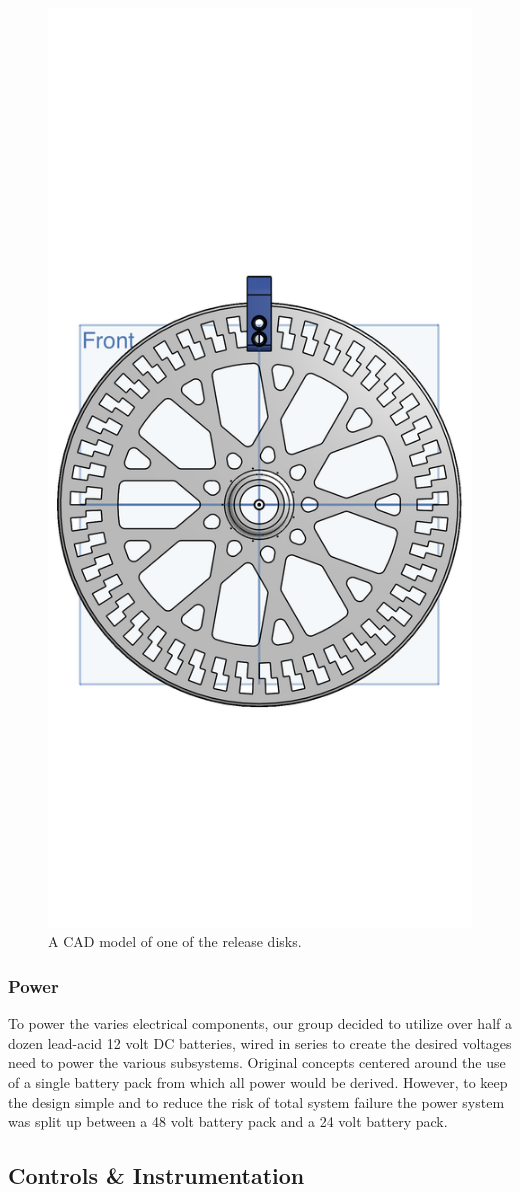 \begin{figure}[H]
  \centering
  \includegraphics[width=.5\textwidth]{Figures/ReleaseDisk1.png}
  \caption{\label{fig:ReleaseDisk1}A CAD model of one of the release disks.}
\end{figure}

\subsubsection{Power}

\indent\indent To power the varies electrical components, our group decided to utilize over half a dozen lead-acid 12 volt DC batteries, wired in series to create the desired voltages need to power the various subsystems. Original concepts centered around the use of a single battery pack from which all power would be derived. However, to keep the design simple and to reduce the risk of total system failure the power system was split up between a 48 volt battery pack and a 24 volt battery pack. 


\subsection{Controls \& Instrumentation}

